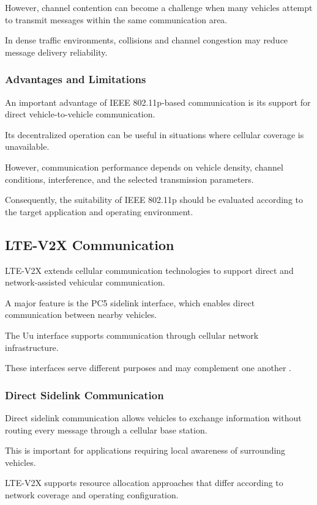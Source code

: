 However, channel contention can
become a challenge when many
vehicles attempt to transmit
messages within the same
communication area.

In dense traffic environments,
collisions and channel congestion
may reduce message delivery
reliability.

\subsubsection{Advantages and Limitations}

An important advantage of
IEEE 802.11p-based communication
is its support for direct
vehicle-to-vehicle communication.

Its decentralized operation
can be useful in situations
where cellular coverage
is unavailable.

However, communication
performance depends on
vehicle density, channel
conditions, interference,
and the selected
transmission parameters.

Consequently, the suitability
of IEEE 802.11p should be
evaluated according to
the target application
and operating environment.

\subsection{LTE-V2X Communication}

LTE-V2X extends cellular
communication technologies
to support direct and
network-assisted vehicular
communication.

A major feature is the
PC5 sidelink interface,
which enables direct
communication between
nearby vehicles.

The Uu interface supports
communication through
cellular network
infrastructure.

These interfaces serve
different purposes and
may complement one another
\cite{Molina2017,MacHardy2018}.

\subsubsection{Direct Sidelink Communication}

Direct sidelink communication
allows vehicles to exchange
information without routing
every message through a
cellular base station.

This is important for
applications requiring
local awareness of
surrounding vehicles.

LTE-V2X supports
resource allocation
approaches that differ
according to network
coverage and
operating configuration.


